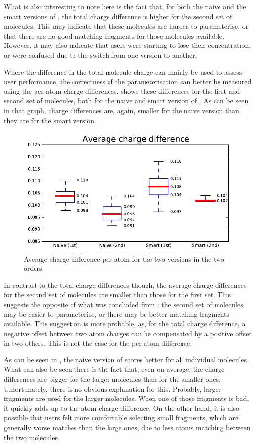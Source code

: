 What is also interesting to note here is the fact that, for both the naive and the smart versions of \oframp, the total charge difference is higher for the second set of molecules. This may indicate that these molecules are harder to parameterise, or that there are no good matching fragments for those molecules available. However, it may also indicate that users were starting to lose their concentration, or were confused due to the switch from one version to another.

Where the difference in the total molecule charge can mainly be used to assess user performance, the correctness of the parameterisation can better be measured using the per-atom charge differences.  shows these differences for the first and second set of molecules, both for the naive and smart version of \oframp. As can be seen in that graph, charge differences are, again, smaller for the naive version than they are for the smart version.

\begin{figure}[h!]
\center
\includegraphics[width=.6\textwidth]{img/graphs/1a_01.pdf}
\caption{Average charge difference per atom for the two versions in the two orders.}
\end{figure}

In contrast to the total charge differences though, the average charge differences for the second set of molecules are smaller than those for the first set. This suggests the opposite of what was concluded from : the second set of molecules may be easier to parameterise, or there may be better matching fragments available. This suggestion is more probable, as, for the total charge difference, a negative offset between two atom charges can be compensated by a positive offset in two others. This is not the case for the per-atom difference.

As can be seen in , the naive version of \oframp{} scores better for all individual molecules. What can also be seen there is the fact that, even on average, the charge differences are bigger for the larger molecules than for the smaller ones. Unfortunately, there is no obvious explanation for this. Probably, larger fragments are used for the larger molecules. When one of those fragments is bad, it quickly adds up to the atom charge difference. On the other hand, it is also possible that users felt more comfortable selecting small fragments, which are generally worse matches than the large ones, due to less atoms matching between the two molecules.

